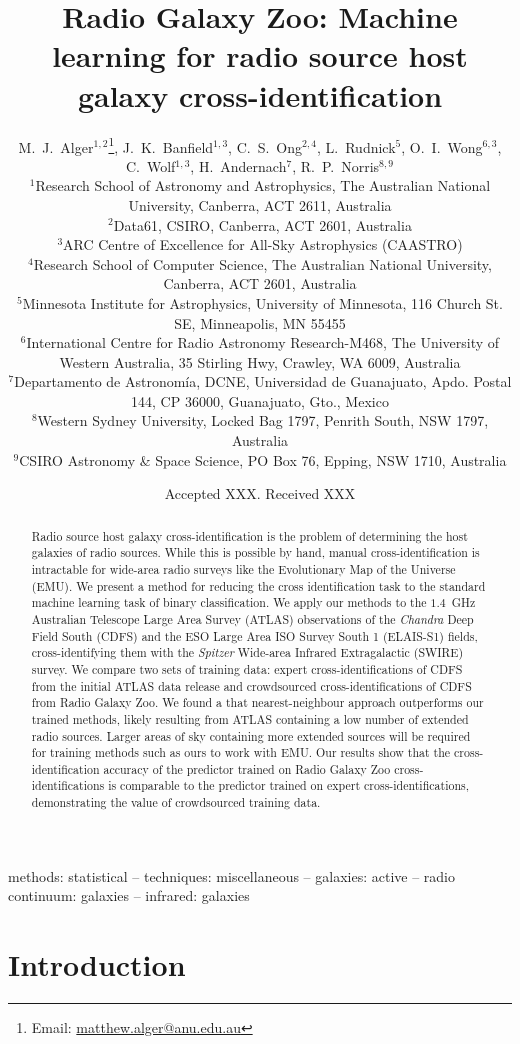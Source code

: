 \documentclass[fleqn,usenatbib,usedcolumn]{mnras}
\title[Machine learning for radio cross-identification]{Radio Galaxy Zoo: Machine learning for radio source host galaxy cross-identification}
\author[Alger et al.]{M.~J.~Alger$^{1, 2}$\thanks{Email: \href{mailto:matthew.alger@anu.edu.au}{matthew.alger@anu.edu.au}},
  J.~K.~Banfield$^{1, 3}$,
  C.~S.~Ong$^{2, 4}$,
  L.~Rudnick$^{5}$,
  O.~I.~Wong$^{6, 3}$,
  C.~Wolf$^{1, 3}$,
  \newauthor
  H.~Andernach$^{7}$,
  R.~P.~Norris$^{8, 9}$
\\
$^{1}$Research School of Astronomy and Astrophysics, The Australian National University, Canberra, ACT 2611, Australia\\
$^{2}$Data61, CSIRO, Canberra, ACT 2601, Australia\\
$^{3}$ARC Centre of Excellence for All-Sky Astrophysics (CAASTRO)\\
$^{4}$Research School of Computer Science, The Australian National University, Canberra, ACT 2601, Australia\\
$^{5}$Minnesota Institute for Astrophysics, University of Minnesota, 116 Church St. SE, Minneapolis, MN 55455\\
$^{6}$International Centre for Radio Astronomy Research-M468, The University of Western Australia, 35 Stirling Hwy, Crawley, WA 6009, Australia\\
$^{7}$Departamento de Astronom\'ia, DCNE, Universidad de Guanajuato, Apdo. Postal 144, CP 36000, Guanajuato, Gto., Mexico\\
$^{8}$Western Sydney University, Locked Bag 1797, Penrith South, NSW 1797, Australia\\
$^{9}$CSIRO Astronomy \& Space Science, PO Box 76, Epping, NSW 1710, Australia
}
\date{Accepted XXX. Received XXX}
\begin{document}
\label{firstpage}
\pagerange{\pageref{firstpage}--\pageref{lastpage}}
\maketitle

\begin{abstract}
  Radio source host galaxy cross-identification is the problem of determining the host galaxies of radio sources. While this is possible by hand, manual cross-identification is intractable for wide-area radio surveys like the Evolutionary Map of the Universe (EMU). We present a method for reducing the cross identification task to the standard machine learning task of binary classification. We apply our methods to the $1.4$~GHz Australian Telescope Large Area Survey (ATLAS) observations of the \emph{Chandra} Deep Field South (CDFS) and the ESO Large Area ISO Survey South 1 (ELAIS-S1) fields, cross-identifying them with the \emph{Spitzer} Wide-area Infrared Extragalactic (SWIRE) survey. We compare two sets of training data: expert cross-identifications of CDFS from the initial ATLAS data release and crowdsourced cross-identifications of CDFS from Radio Galaxy Zoo. We found a that nearest-neighbour approach outperforms our trained methods, likely resulting from ATLAS containing a low number of extended radio sources. Larger areas of sky containing more extended sources will be required for training methods such as ours to work with EMU. Our results show that the cross-identification accuracy of the predictor trained on Radio Galaxy Zoo cross-identifications is comparable to the predictor trained on expert cross-identifications, demonstrating the value of crowdsourced training data.
\end{abstract}

\begin{keywords}
methods: statistical -- techniques: miscellaneous -- galaxies: active -- radio continuum: galaxies -- infrared: galaxies\\
\end{keywords}


\section{Introduction}\label{introduction}
\end{document}
